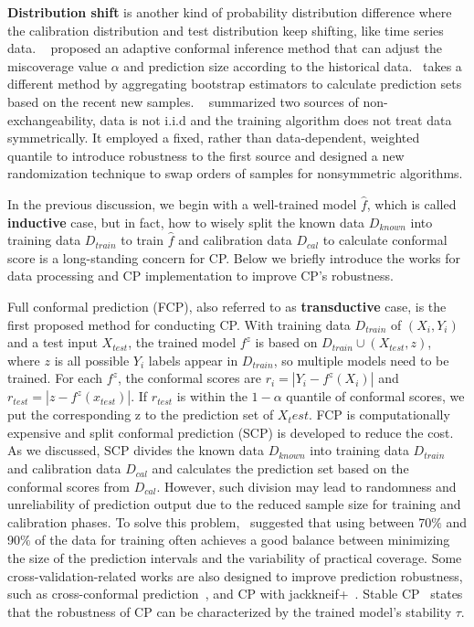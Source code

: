 \textbf{Distribution shift} is another kind of probability distribution difference where the calibration distribution and test distribution keep shifting, like time series data. ~\cite{Gibbs2021AdaptiveCI} proposed an adaptive conformal inference method that can adjust the miscoverage value $\alpha$ and prediction size according to the historical data.~\cite{xu2021conformal} takes a different method by aggregating bootstrap estimators to calculate prediction sets based on the recent new samples. ~\cite{barber2023conformal} summarized two sources of non-exchangeability, data is not i.i.d and the training algorithm does not treat data symmetrically. It employed a fixed, rather than data-dependent, weighted quantile to introduce robustness to the first source and designed a new randomization technique to swap orders of samples for nonsymmetric algorithms.

In the previous discussion, we begin with a well-trained model $\hat{f}$, which is called \textbf{inductive} case, but in fact, how to wisely split the known data $D_{known}$ into training data $D_{train}$ to train $\hat{f}$ and calibration data $D_{cal}$ to calculate conformal score is a long-standing concern for CP. Below we briefly introduce the works for data processing and CP implementation to improve CP's robustness. 

Full conformal prediction (FCP), also referred to as \textbf{transductive} case, is the first proposed method for conducting CP. With training data $D_{train}$ of $(X_i,Y_i)$ and a test input $X_{test}$, the trained model $f^z$ is based on $D_{train}\cup (X_{test},z) $, where $z$ is all possible $Y_i$ labels appear in $D_{train}$, so multiple models need to be trained. For each $f^z$, the conformal scores are $r_i=|Y_i-f^z(X_i)|$ and $r_{test}=|z-f^z(x_{test})|$. If $r_{test}$ is within the $1-\alpha$ quantile of conformal scores, we put the corresponding z to the prediction set of $X_test$. FCP is computationally expensive and split conformal prediction (SCP) is developed to reduce the cost. As we discussed, SCP divides the known data $D_{known}$ into training data $D_{train}$ and calibration data $D_{cal}$ and calculates the prediction set based on the conformal scores from $D_{cal}$. However, such division may lead to randomness and unreliability of prediction output due to the reduced sample size for training and calibration phases. To solve this problem,~\cite{Sesia2019ACO} suggested that using between 70$\%$ and 90$\%$ of the data for training often achieves a good balance between minimizing the size of the prediction intervals and the variability of practical coverage. Some cross-validation-related works are also designed to improve prediction robustness, such as cross-conformal prediction~\cite{Vovk2012CrossconformalP,vovk2018cross}, and CP with jackkneif+~\cite{Barber2019PredictiveIW}. Stable CP~\cite{ndiaye2022stable} states that the robustness of CP can be characterized by the trained model's stability $\tau$. 

